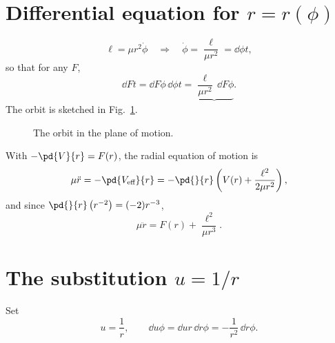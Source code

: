 \documentclass[11pt]{article}
\begin{document}
\section{Differential equation for \texorpdfstring{$r = r(\phi)$}{r = r(phi)}}

\begin{equation}
  \ell = \mu r^{2}\dot{\phi}
  \quad\Longrightarrow\quad
  \dot{\phi} = \frac{\ell}{\mu r^{2}} = \dd{\phi}{t},
\end{equation}
so that for any $F$,
\begin{equation}
  \dd{F}{t} = \dd{F}{\phi}\,\dd{\phi}{t}
            = \underbrace{\frac{\ell}{\mu r^{2}}\,\dd{F}{\phi}}_{}\!.
  \label{eq:operator}
\end{equation}
The orbit is sketched in Fig.~\ref{fig:orbit}.

\begin{figure}[htbp]
  \centering
  \caption{The orbit in the plane of motion.}
  \label{fig:orbit}
\end{figure}

With $-\pd{V}{r} = F(r)$, the radial equation of motion is
\begin{equation}
  \mu\ddot{r} = -\pd{V_{\text{eff}}}{r}
              = -\pd{}{r}\left(V(r) + \frac{\ell^{2}}{2\mu r^{2}}\right),
\end{equation}
and since $\pd{}{r}\left(r^{-2}\right) = (-2)r^{-3}$,
\begin{equation}
  \mu\ddot{r} = F(r) + \frac{\ell^{2}}{\mu r^{3}}.
\end{equation}

\section{The substitution \texorpdfstring{$u = 1/r$}{u = 1/r}}

Set
\begin{equation}
  u = \frac{1}{r},
  \qquad
  \dd{u}{\phi} = \dd{u}{r}\,\dd{r}{\phi} = -\frac{1}{r^{2}}\,\dd{r}{\phi}.
\end{equation}
\end{document}
